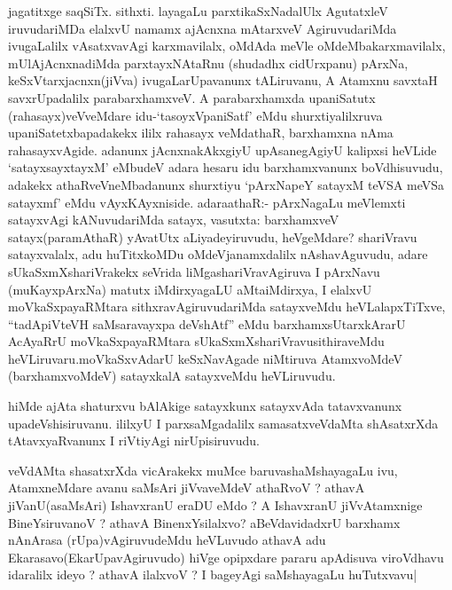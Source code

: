 

\begin{artha}
jagatitxge saqSiTx. sithxti. layagaLu parxtikaSxNadalUlx AgutatxleV
iruvudariMDa elalxvU namamx ajAcnxna mAtarxveV AgiruvudariMda
ivugaLalilx vAsatxvavAgi karxmavilalx, oMdAda meVle
oMdeMbakarxmavilalx, mUlAjAcnxnadiMda parxtayxNAtaRnu (shudadhx
cidUrxpanu) pArxNa, keSxVtarxjacnxn(jiVva) ivugaLarUpavanunx
tALiruvanu, A Atamxnu savxtaH savxrUpadalilx parabarxhamxveV. A
parabarxhamxda upaniSatutx (rahasayx)veVveMdare idu-`tasoyxVpaniSatf'
eMdu shurxtiyalilxruva upaniSatetxbapadakekx ililx rahasayx veMdathaR,
barxhamxna nAma rahasayxvAgide. adanunx jAcnxnakAkxgiyU upAsanegAgiyU
kalipxsi heVLide `satayxsayxtayxM' eMbudeV adara hesaru  idu
barxhamxvanunx boVdhisuvudu, adakekx athaRveVneMbadanunx shurxtiyu
`pArxNapeY satayxM teVSA meVSa satayxmf' eMdu
vAyxKAyxniside. adaraathaR:- pArxNagaLu meVlemxti satayxvAgi
kANuvudariMda satayx, vasutxta: barxhamxveV satayx(paramAthaR)
yAvatUtx aLiyadeyiruvudu, heVgeMdare? shariVravu satayxvalalx, adu
huTitxkoMDu oMdeVjanamxdalilx nAshavAguvudu, adare
sUkaSxmXshariVrakekx seVrida liMgashariVravAgiruva I pArxNavu
(muKayxpArxNa) matutx iMdirxyagaLU aMtaiMdirxya, I elalxvU
moVkaSxpayaRMtara sithxravAgiruvudariMda satayxveMdu heVLalapxTiTxve,
``tadApiVteVH saMsaravayxpa deVshAtf'' eMdu
barxhamxsUtarxkArarU AcAyaRrU moVkaSxpayaRMtara
sUkaSxmXshariVravusithiraveMdu heVLiruvaru.moVkaSxvAdarU keSxNavAgade
niMtiruva AtamxvoMdeV (barxhamxvoMdeV) satayxkalA satayxveMdu
heVLiruvudu.  
\end{artha}

\begin{artha}

hiMde ajAta shaturxvu bAlAkige satayxkunx satayxvAda tatavxvanunx
upadeVshisiruvanu. ililxyU I parxsaMgadalilx samasatxveVdaMta
shAsatxrXda tAtavxyaRvanunx I riVtiyAgi nirUpisiruvudu.
\end{artha}



\begin{artha}
veVdAMta shasatxrXda vicArakekx muMce baruvashaMshayagaLu ivu,
AtamxneMdare avanu saMsAri jiVvaveMdeV athaRvoV ? athavA
jiVanU(asaMsAri) IshavxranU eraDU eMdo ? A IshavxranU jiVvAtamxnige
BineYsiruvanoV ? athavA BinenxYsilalxvo? aBeVdavidadxrU barxhamx
nAnArasa (rUpa)vAgiruvudeMdu heVLuvudo athavA adu
Ekarasavo(EkarUpavAgiruvudo) hiVge opipxdare pararu apAdisuva
viroVdhavu idaralilx ideyo ? athavA ilalxvoV ? I bageyAgi saMshayagaLu huTutxvavu|
\end{artha}


